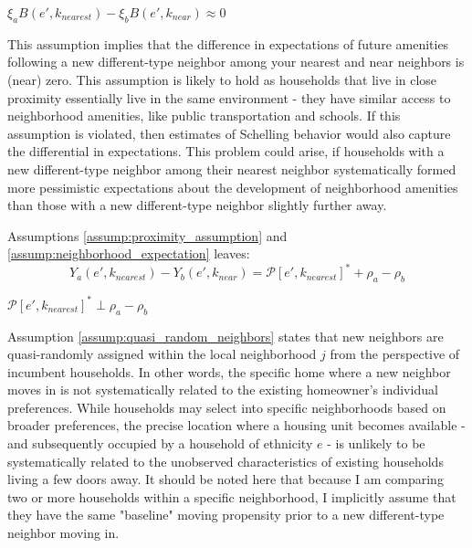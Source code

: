 \documentclass[../main.tex]{subfiles}
\begin{document}
\begin{assumption}
    \label{assump:neighborhood_expectation}
    $\xi_a B(e', k_{nearest}) - \xi_b B(e', k_{near})\approx0$
\end{assumption}

This assumption implies that the difference in expectations of future amenities following a new different-type neighbor among your nearest and near neighbors is (near) zero. This assumption is likely to hold as households that live in close proximity essentially live in the same environment - they have similar access to neighborhood amenities, like public transportation and schools. If this assumption is violated, then estimates of Schelling behavior would also capture the differential in expectations. This problem could arise, if households with a new different-type neighbor among their nearest neighbor systematically formed more pessimistic expectations about the development of neighborhood amenities than those with a new different-type neighbor slightly further away. 

Assumptions \ref{assump:proximity_assumption} and \ref{assump:neighborhood_expectation} leaves:
\begin{equation}
    Y_a(e', k_{nearest}) - Y_b(e', k_{near}) = \mathcal{P}[e', k_{nearest}]^* + \rho_a - \rho_b
\end{equation}

\begin{assumption}
    \label{assump:quasi_random_neighbors}
    $\mathcal{P}[e', k_{nearest}]^* \perp \rho_a - \rho_b$
\end{assumption}

Assumption \ref{assump:quasi_random_neighbors} states that new neighbors are quasi-randomly assigned within the local neighborhood $j$ from the perspective of incumbent households. In other words, the specific home where a new neighbor moves in is not systematically related to the existing homeowner's individual preferences. While households may select into specific neighborhoods based on broader preferences, the precise location where a housing unit becomes available - and subsequently occupied by a household of ethnicity $e$ - is unlikely to be systematically related to the unobserved characteristics of existing households living a few doors away.  It should be noted here that because I am comparing two or more households within a specific neighborhood, I implicitly assume that they have the same "baseline" moving propensity prior to a new different-type neighbor moving in. 
\end{document}
